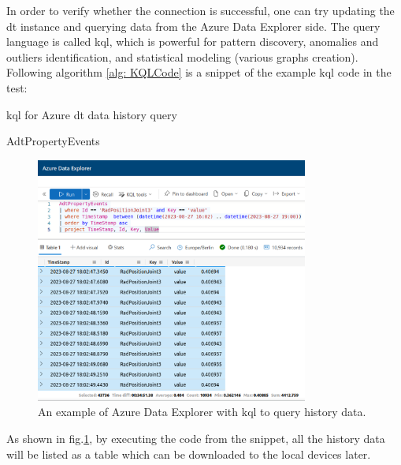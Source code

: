 In order to verify whether the connection is successful, one can try updating the 
\gls{dt} instance and querying data from the Azure Data Explorer side. The query
language is called \gls{kql}, which is powerful for pattern discovery, anomalies 
and outliers identification, and statistical modeling (various graphs creation). 
Following algorithm \ref{alg: KQLCode} is a snippet of the example \gls{kql} code in the test: 

\begin{algorithm}
    \caption{\gls{kql} for Azure \gls{dt} data history query}
    \label{alg: KQLCode}
    \begin{algorithmic}
        \State  AdtPropertyEvents 
    \end{algorithmic}
\end{algorithm}


\begin{figure}[htb]
    \centering
    \includegraphics[width=0.8\textwidth]{figures/methodology/KQL_cut.jpg}
    \caption{An example of Azure Data Explorer with \gls{kql} to 
    query history data.\label{fig: KQL}}
\end{figure}

As shown in fig.\ref{fig: KQL}, by executing the code from the snippet, all the history data will be listed as a table 
which can be downloaded to the local devices later. 

